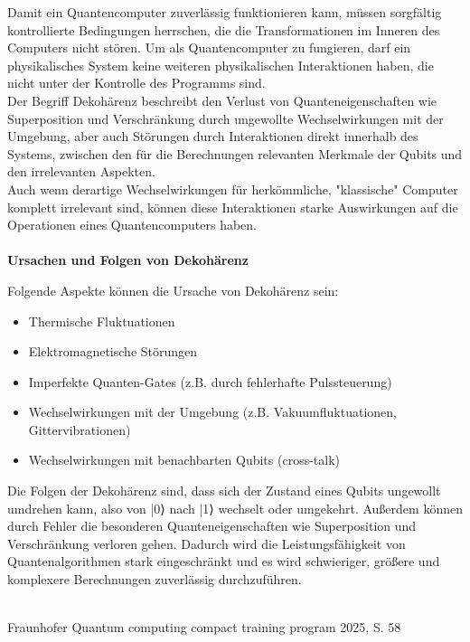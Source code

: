 Damit ein Quantencomputer zuverlässig funktionieren kann, müssen sorgfältig kontrollierte Bedingungen herrschen, die die Transformationen im Inneren des Computers nicht stören. Um als Quantencomputer zu fungieren, darf ein physikalisches System keine weiteren physikalischen Interaktionen haben, die nicht unter der Kontrolle des Programms sind. \\
Der Begriff Dekohärenz beschreibt den Verlust von Quanteneigenschaften wie Superposition und Verschränkung durch ungewollte Wechselwirkungen mit der Umgebung, aber auch Störungen durch Interaktionen direkt innerhalb des Systems, zwischen den für die Berechnungen relevanten Merkmale der Qubits und den irrelevanten Aspekten. \\
Auch wenn derartige Wechselwirkungen für herkömmliche, "klassische" Computer komplett irrelevant sind, können diese Interaktionen starke Auswirkungen auf die Operationen eines Quantencomputers haben. 
\cite{mermin_quantum_2012}\\
\\
\textbf{Ursachen und Folgen von Dekohärenz}


Folgende Aspekte können die Ursache von Dekohärenz sein:\\
\begin{itemize}
    \item Thermische Fluktuationen
    \item Elektromagnetische Störungen
    \item Imperfekte Quanten-Gates (z.B. durch fehlerhafte Pulssteuerung)
    \item Wechselwirkungen mit der Umgebung (z.B. Vakuumfluktuationen, Gittervibrationen)
    \item Wechselwirkungen mit benachbarten Qubits (cross-talk)
\end{itemize}

\cite{mermin_quantum_2012}

Die Folgen der Dekohärenz sind, dass sich der Zustand eines Qubits ungewollt umdrehen kann, also von |0⟩ nach |1⟩ wechselt oder umgekehrt. Außerdem können durch Fehler die besonderen Quanteneigenschaften wie Superposition und Verschränkung verloren gehen. Dadurch wird die Leistungsfähigkeit von Quantenalgorithmen stark eingeschränkt und es wird schwieriger, größere und komplexere Berechnungen zuverlässig durchzuführen.

\cite{fraunhofer_iais_quantum_2023}
\cite{nielsen_quantum_2010}\\
Fraunhofer Quantum computing compact training program 2025, S. 58 
 
